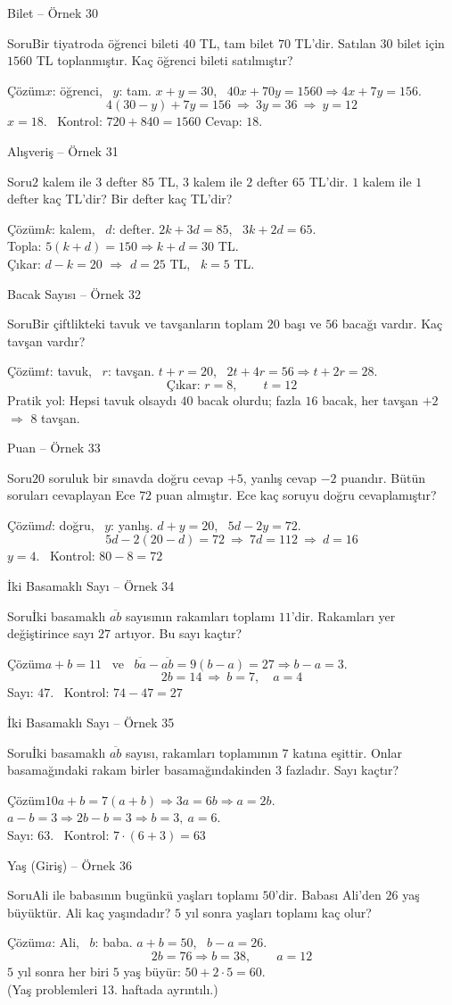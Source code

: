 \documentclass[aspectratio=169,11pt]{beamer}
\newcommand{\soru}[3]{%
\begin{frame}{#1}
  \begin{block}{Soru}\large #2\end{block}
  \pause
  \begin{exampleblock}{Çözüm}\large #3\end{exampleblock}
\end{frame}}
\newcommand{\ab}[1]{\overline{#1}}
\begin{document}
\soru{Bilet -- Örnek 30}
{Bir tiyatroda öğrenci bileti \(40\) TL, tam bilet \(70\) TL'dir. Satılan \(30\) bilet için \(1560\) TL toplanmıştır. Kaç öğrenci bileti satılmıştır?}
{\(x\): öğrenci, \ \(y\): tam. \quad \(x+y=30\), \ \(40x+70y=1560\Rightarrow 4x+7y=156\).
\[4(30-y)+7y=156\ \Rightarrow\ 3y=36\ \Rightarrow\ y=12\]
\(x=18\). \ Kontrol: \(720+840=1560\) \checkmark \quad Cevap: \(18\).}

\soru{Alışveriş -- Örnek 31}
{\(2\) kalem ile \(3\) defter \(85\) TL, \(3\) kalem ile \(2\) defter \(65\) TL'dir. \(1\) kalem ile \(1\) defter kaç TL'dir? Bir defter kaç TL'dir?}
{\(k\): kalem, \ \(d\): defter. \quad \(2k+3d=85\), \ \(3k+2d=65\).\\[3pt]
Topla: \(5(k+d)=150\Rightarrow k+d=30\) TL.\\[3pt]
Çıkar: \(d-k=20\) \(\Rightarrow\) \(d=25\) TL, \ \(k=5\) TL.}

\soru{Bacak Sayısı -- Örnek 32}
{Bir çiftlikteki tavuk ve tavşanların toplam \(20\) başı ve \(56\) bacağı vardır. Kaç tavşan vardır?}
{\(t\): tavuk, \ \(r\): tavşan. \quad \(t+r=20\), \ \(2t+4r=56\Rightarrow t+2r=28\).
\[\text{Çıkar: } r=8,\qquad t=12\]
Pratik yol: Hepsi tavuk olsaydı \(40\) bacak olurdu; fazla \(16\) bacak, her tavşan \(+2\) \(\Rightarrow\) \(8\) tavşan.}

\soru{Puan -- Örnek 33}
{\(20\) soruluk bir sınavda doğru cevap \(+5\), yanlış cevap \(-2\) puandır. Bütün soruları cevaplayan Ece \(72\) puan almıştır. Ece kaç soruyu doğru cevaplamıştır?}
{\(d\): doğru, \ \(y\): yanlış. \quad \(d+y=20\), \ \(5d-2y=72\).
\[5d-2(20-d)=72\ \Rightarrow\ 7d=112\ \Rightarrow\ d=16\]
\(y=4\). \ Kontrol: \(80-8=72\) \checkmark}

\soru{İki Basamaklı Sayı -- Örnek 34}
{İki basamaklı \(\ab{ab}\) sayısının rakamları toplamı \(11\)'dir. Rakamları yer değiştirince sayı \(27\) artıyor. Bu sayı kaçtır?}
{\(a+b=11\) \ ve \ \(\ab{ba}-\ab{ab}=9(b-a)=27\Rightarrow b-a=3\).
\[2b=14\ \Rightarrow\ b=7,\quad a=4\]
Sayı: \(47\). \ Kontrol: \(74-47=27\) \checkmark}

\soru{İki Basamaklı Sayı -- Örnek 35}
{İki basamaklı \(\ab{ab}\) sayısı, rakamları toplamının \(7\) katına eşittir. Onlar basamağındaki rakam birler basamağındakinden \(3\) fazladır. Sayı kaçtır?}
{\(10a+b=7(a+b)\Rightarrow 3a=6b\Rightarrow a=2b\).\\[3pt]
\(a-b=3\Rightarrow 2b-b=3\Rightarrow b=3,\ a=6\).\\[3pt]
Sayı: \(63\). \ Kontrol: \(7\cdot(6+3)=63\) \checkmark}

\soru{Yaş (Giriş) -- Örnek 36}
{Ali ile babasının bugünkü yaşları toplamı \(50\)'dir. Babası Ali'den \(26\) yaş büyüktür. Ali kaç yaşındadır? \(5\) yıl sonra yaşları toplamı kaç olur?}
{\(a\): Ali, \ \(b\): baba. \quad \(a+b=50\), \ \(b-a=26\).
\[2b=76\Rightarrow b=38,\qquad a=12\]
\(5\) yıl sonra her biri \(5\) yaş büyür: \(50+2\cdot 5=60\).\\
{\normalsize (Yaş problemleri 13. haftada ayrıntılı.)}}
\end{document}

